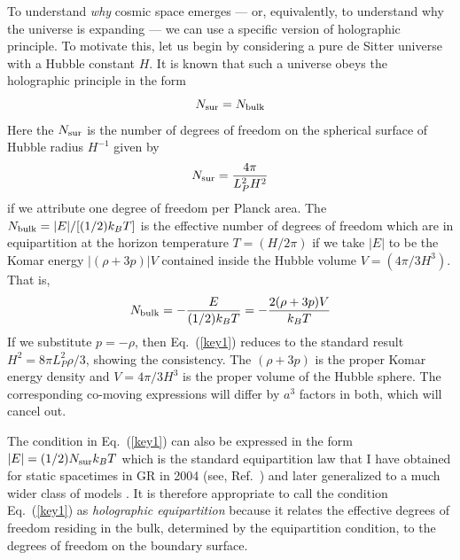 \documentclass[aps,prd,showpacs,nofootinbib,floats,floatfix,preprintnumbers,groupedaddress,twocolumn]{revtex4}
\def\eq#1{{Eq.~(\ref{#1})}}
\begin{document}
To understand \textit{why} cosmic space emerges --- or, equivalently, to understand why the universe is expanding --- we can use a specific version of holographic principle. To motivate this, let us begin by considering a pure de Sitter universe with a Hubble constant $H$. It is known that such a universe obeys the holographic principle in the form
\begin{equation}
 N_{\rm sur} = N_{\rm bulk}
\label{key1}
\end{equation} 
Here the $N_{\rm sur}$ is the number of degrees of freedom on the spherical surface of Hubble radius  $H^{-1}$ given by
\begin{equation}
 N_{\rm sur} = \frac{4\pi}{L_P^2 H^2}
\end{equation} 
if we attribute one degree of freedom per Planck area.
The $N_{\rm bulk} = |E|/[(1/2)k_BT]$ is the effective number of degrees of freedom which are in equipartition  at the horizon temperature $T=(H/2\pi)$ if we take $|E|$ to be the Komar energy $|(\rho +3p)| V$ contained inside the Hubble volume $V=(4\pi/3H^3)$. That is, 
\begin{equation}
 N_{\rm bulk}=-\frac{E}{(1/2) k_BT} = - \frac{2(\rho +3p)V}{k_BT} 
\label{Nbulk}
\end{equation} 
If we substitute $p=-\rho$, then \eq{key1} reduces to the standard result $H^2= 8\pi L_P^2 \rho/3$, showing the consistency.
The $(\rho +3p)$ is the proper Komar energy density and $V = 4\pi/3H^3$ is the proper volume of the Hubble sphere. The corresponding co-moving expressions will differ by $a^3$ factors in both, which will cancel out.

The condition in \eq{key1} can also be expressed in the form $|E| = (1/2)N_{\rm sur} k_BT$ which is the standard equipartition law that I have obtained  for static spacetimes in GR in 2004 (see, Ref.~\cite{cqg04}) and later generalized to a much wider class of models \cite{tpsurface}. It is therefore appropriate to call the condition \eq{key1} as \textit{holographic equipartition} because it relates the effective degrees of freedom residing in the bulk, determined by the equipartition condition, to the degrees of freedom on the boundary surface.
\end{document}
